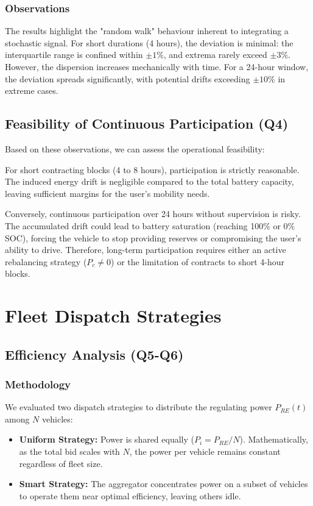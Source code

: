 \documentclass{article}
\begin{document}
\subsubsection{Observations}
The results highlight the "random walk" behaviour inherent to integrating a stochastic signal.
For short durations (4 hours), the deviation is minimal: the interquartile range is confined within $\pm 1\%$, and extrema rarely exceed $\pm 3\%$. However, the dispersion increases mechanically with time. For a 24-hour window, the deviation spreads significantly, with potential drifts exceeding $\pm 10\%$ in extreme cases.

\subsection{Feasibility of Continuous Participation (Q4)}
Based on these observations, we can assess the operational feasibility:

For short contracting blocks (4 to 8 hours), participation is strictly reasonable. The induced energy drift is negligible compared to the total battery capacity, leaving sufficient margins for the user's mobility needs.

Conversely, continuous participation over 24 hours without supervision is risky. The accumulated drift could lead to battery saturation (reaching 100\% or 0\% SOC), forcing the vehicle to stop providing reserves or compromising the user's ability to drive. Therefore, long-term participation requires either an active rebalancing strategy ($P_c \neq 0$) or the limitation of contracts to short 4-hour blocks.

\section{Fleet Dispatch Strategies}

\subsection{Efficiency Analysis (Q5-Q6)}

\subsubsection{Methodology}
We evaluated two dispatch strategies to distribute the regulating power $P_{RE}(t)$ among $N$ vehicles:
\begin{itemize}
    \item \textbf{Uniform Strategy:} Power is shared equally ($P_{i} = P_{RE}/N$). Mathematically, as the total bid scales with $N$, the power per vehicle remains constant regardless of fleet size.
    \item \textbf{Smart Strategy:} The aggregator concentrates power on a subset of vehicles to operate them near optimal efficiency, leaving others idle.
\end{itemize}
\end{document}
